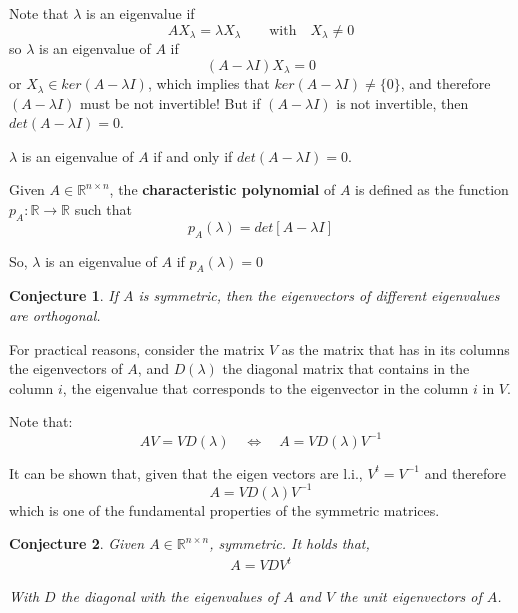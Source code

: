 \documentclass[aspectratio=169]{beamer}
\newtheorem{proposition}{Conjecture}[section]
\begin{document}
\begin{frame}
    Note that $\lambda$ is an eigenvalue if $$A X_{\lambda}=\lambda X_\lambda\quad\quad\text{with}\quad X_\lambda\neq0$$ so $\lambda$ is an eigenvalue of $A$ if $$(A-\lambda I)X_\lambda =0$$ or $X_\lambda\in ker(A-\lambda I)$, which implies that $ker(A-\lambda I)\neq \{0\}$, and therefore $(A-\lambda I)$ must be not invertible! But if $(A-\lambda I)$ is not invertible, then $det(A-\lambda I) = 0$. 
    
    \begin{corollary}
        $\lambda$ is an eigenvalue of $A$ if and only if $det(A-\lambda I)=0$.
    \end{corollary}
\end{frame}

\begin{frame}
    \begin{definition}
    Given $A\in\mathbb{R}^{n\times n}$, the \textbf{characteristic polynomial} of $A$ is defined as the function $p_A:\mathbb{R}\rightarrow\mathbb{R}$ such that $$p_A(\lambda)=det[A-\lambda I]$$
    \end{definition}

    So, $\lambda$ is an eigenvalue of $A$ if $p_A(\lambda)=0$

\end{frame}

\begin{frame}
    \begin{proposition}
        If $A$ is symmetric, then the eigenvectors of different eigenvalues are orthogonal.
    \end{proposition}
    
    For practical reasons, consider the matrix $V$ as the matrix that has in its columns the eigenvectors of $A$, and $D(\lambda)$ the diagonal matrix that contains in the column $i$, the eigenvalue that corresponds to the eigenvector in the column $i$ in $V$.
    
    Note that:
    $$ A V = V D(\lambda)\quad\Leftrightarrow\quad A = V D(\lambda) V^{-1}$$
    
    It can be shown that, given that the eigen vectors are l.i., $V^t=V^{-1}$ and therefore $$A=V D(\lambda) V^{-1}$$ which is one of the fundamental properties of the symmetric matrices.
\end{frame}

\begin{frame}
    \begin{proposition}
        Given $A\in\mathbb{R}^{n\times n}$, symmetric. It holds that,
        \begin{align*}
            A  = V D V^t
        \end{align*}
        
        With $D$ the diagonal with the eigenvalues of $A$ and $V$ the unit eigenvectors of $A$.
    \end{proposition}
\end{frame}
\end{document}

